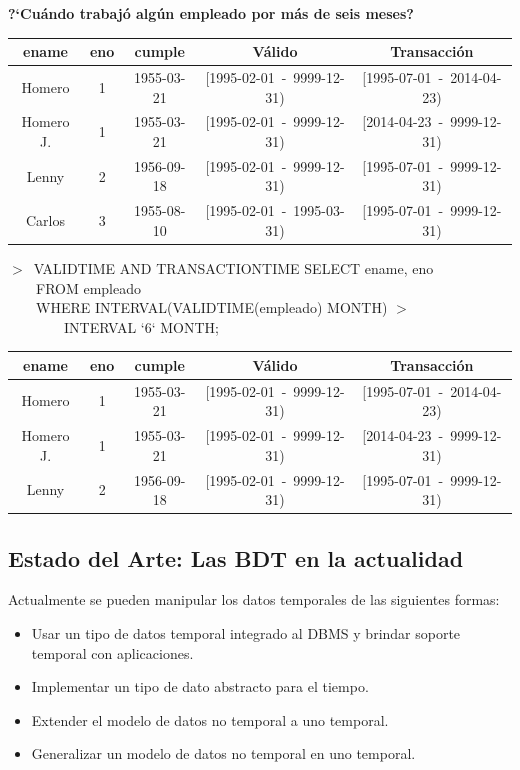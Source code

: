 \documentclass[a4paper,12pt,oneside]{report}
\begin{document}
\textbf{?`Cu\'ando trabaj\'o alg\'un empleado por m\'as de seis meses?}
\begin{center}
\begin{tabular}{|c|c|c||c|c|}
\hline
ename & eno & cumple & V\'alido & Transacci\'on\\
\hline
Homero & 1 & 1955-03-21 & [1995-02-01\ -\ 9999-12-31) & [1995-07-01\ -\ 2014-04-23)\\
\hline
Homero J. & 1 & 1955-03-21 & [1995-02-01\ -\ 9999-12-31) & [2014-04-23\ -\ 9999-12-31)\\
\hline
Lenny & 2 & 1956-09-18 & [1995-02-01\ -\ 9999-12-31) & [1995-07-01\ -\ 9999-12-31)\\
\hline
Carlos & 3 & 1955-08-10 & [1995-02-01\ -\ 1995-03-31) & [1995-07-01\ -\ 9999-12-31)\\
\hline
\end{tabular}
\end{center}
\begin{small}$>$\ VALIDTIME AND TRANSACTIONTIME SELECT ename, eno\\
\ \ \ \ FROM empleado\\
\ \ \ \ WHERE INTERVAL(VALIDTIME(empleado) MONTH) $>$\\
\ \ \ \ \ \ \ \ INTERVAL `6` MONTH;
\end{small}
\begin{center}
\begin{tabular}{|c|c|c||c|c|}
\hline
ename & eno & cumple & V\'alido & Transacci\'on\\
\hline
Homero & 1 & 1955-03-21 & [1995-02-01\ -\ 9999-12-31) & [1995-07-01\ -\ 2014-04-23)\\
\hline
Homero J. & 1 & 1955-03-21 & [1995-02-01\ -\ 9999-12-31) & [2014-04-23\ -\ 9999-12-31)\\
\hline
Lenny & 2 & 1956-09-18 & [1995-02-01\ -\ 9999-12-31) & [1995-07-01\ -\ 9999-12-31)\\
\hline
\end{tabular}
\end{center}
\subsection*{Estado del Arte: Las BDT en la actualidad}
Actualmente se pueden manipular los datos temporales de las siguientes formas:
\begin{itemize}
\item Usar un tipo de datos temporal integrado al DBMS y brindar soporte temporal con aplicaciones.
\item Implementar un tipo de dato abstracto para el tiempo.
\item Extender el modelo de datos no temporal a uno temporal.
\item Generalizar un modelo de datos no temporal en uno temporal.
\end{itemize}
\end{document}
